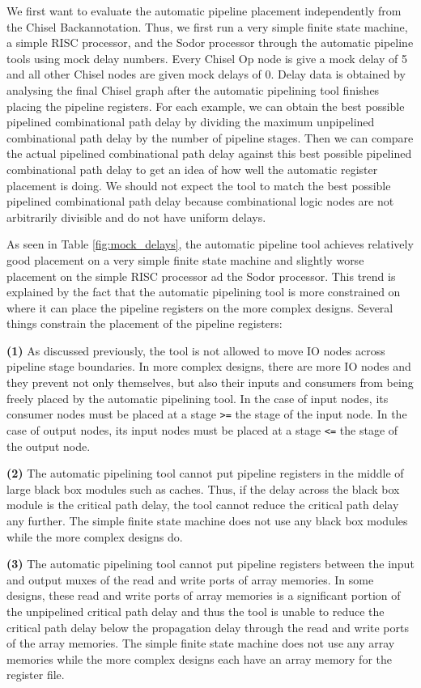 We first want to evaluate the automatic pipeline placement independently from the Chisel Backannotation. Thus, we first run a very simple finite state machine, a simple RISC processor, and the Sodor processor through the automatic pipeline tools using mock delay numbers. Every Chisel Op node is give a mock delay of 5 and all other Chisel nodes are given mock delays of 0. Delay data is obtained by analysing the final Chisel graph after the automatic pipelining tool finishes placing the pipeline registers. For each example, we can obtain the best possible pipelined combinational path delay by dividing the maximum unpipelined combinational path delay by the number of pipeline stages. Then we can compare the actual pipelined combinational path delay against this best possible pipelined combinational path delay to get an idea of how well the automatic register placement is doing. We should not expect the tool to match the best possible pipelined combinational path delay because combinational logic nodes are not arbitrarily divisible and do not have uniform delays.

As seen in Table \ref{fig:mock_delays}, the automatic pipeline tool achieves relatively good  placement on a very simple finite state machine and slightly worse placement on the simple RISC processor ad the Sodor processor. This trend is explained by the fact that the automatic pipelining tool is more constrained on where it can place the pipeline registers on the more complex designs. Several things constrain the placement of the pipeline registers:

{\bf (1)} 
As discussed previously, the tool is not allowed to move IO nodes across pipeline stage boundaries. In more complex designs, there are more IO nodes and they prevent not only themselves, but also their inputs and consumers from being freely placed by the automatic pipelining tool. In the case of input nodes, its consumer nodes must be placed at a stage {\tt >=} the stage of the input node. In the case of output nodes, its input nodes must be placed at a stage {\tt <=} the stage of the output node.

{\bf (2)}  
The automatic pipelining tool cannot put pipeline registers in the middle of large black box modules such as caches. Thus, if the delay across the black box module is the critical path delay, the tool cannot reduce the critical path delay any further. The simple finite state machine does not use any black box modules while the more complex designs do.

{\bf (3)} 
The automatic pipelining tool cannot put pipeline registers between the input and output muxes of the read and write ports of array memories. In some designs, these read and write ports of array memories is a significant portion of the unpipelined critical path delay and thus the tool is unable to reduce the critical path delay below the propagation delay through the read and write ports of the array memories. The simple finite state machine does not use any array memories while the more complex designs each have an array memory for the register file.

